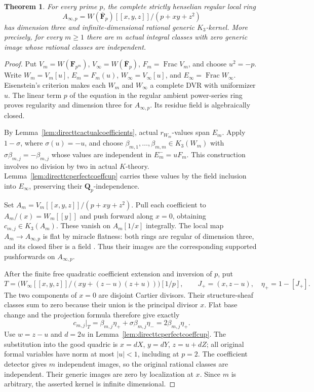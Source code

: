 \documentclass[11pt,a4paper]{article}
\newtheorem{theorem}{Theorem}[section]
\theoremstyle{remark}
\begin{document}
\begin{theorem}\label{thm:directtcstrictinfiniteallp}
For every prime $p$, the complete strictly henselian regular local ring
\[
 A_{\infty,p}=W(\overline{\mathbf F}_p)[[x,y,z]]/(p+xy+z^2)
\]
has dimension three and infinite-dimensional rational generic
$K_3$-kernel. More precisely, for every $m\ge1$ there are $m$ actual
integral classes with zero generic image whose rational classes are
independent.
\end{theorem}
\begin{proof}
Put $V_m=W(\mathbf F_{p^m})$, $V_\infty=W(\overline{\mathbf F}_p)$,
$F_m=\operatorname{Frac}V_m$, and choose $u^2=-p$. Write
$W_m=V_m[u]$, $E_m=F_m(u)$, $W_\infty=V_\infty[u]$, and
$E_\infty=\operatorname{Frac}W_\infty$. Eisenstein's criterion makes
each $W_m$ and $W_\infty$ a complete DVR with uniformizer $u$.
The linear term $p$ of the equation in the regular ambient
power-series ring proves regularity and dimension three for
$A_{\infty,p}$. Its residue field is algebraically closed.

By Lemma~\ref{lem:directtcactualcoefficients}, actual $r_{W_m}$-values
span $E_m$. Apply $1-\sigma$, where $\sigma(u)=-u$, and choose
$\beta_{m,1},\ldots,\beta_{m,m}\in K_3(W_m)$ with
$\sigma\beta_{m,j}=-\beta_{m,j}$ whose values are independent in
$E_m^-=uF_m$. This construction involves no division by two in
actual $K$-theory. Lemma~\ref{lem:directtcperfectcoeffcup} carries
these values by the field inclusion into $E_\infty$, preserving
their $\mathbf Q_p$-independence.

Set $A_m=V_m[[x,y,z]]/(p+xy+z^2)$. Pull each coefficient to
$A_m/(x)=W_m[[y]]$ and push forward along $x=0$, obtaining
$c_{m,j}\in K_3(A_m)$. These vanish on $A_m[1/x]$ integrally.
The local map $A_m\to A_{\infty,p}$ is flat by miracle flatness:
both rings are regular of dimension three, and its closed fiber
is a field \cite[Tag~00R4]{StacksFlatness}. Thus their images
are the corresponding supported pushforwards on $A_{\infty,p}$.

After the finite free quadratic coefficient extension and inversion
of $p$, put
\[
 T=\bigl(W_\infty[[x,y,z]]/(xy+(z-u)(z+u))\bigr)[1/p],
 \qquad J_+=(x,z-u),\quad\eta_+=1-[J_+].
\]
The two components of $x=0$ are disjoint Cartier divisors. Their
structure-sheaf classes sum to zero because their union is the
principal divisor $x$. Flat base change and the projection formula
therefore give exactly
\[
 c_{m,j}|_T=\beta_{m,j}\eta_+
          +\sigma\beta_{m,j}\eta_-
          =2\beta_{m,j}\eta_+.
\]
Use $w=z-u$ and $d=2u$ in
Lemma~\ref{lem:directtcperfectcoeffcup}. The substitution into the
good quadric is
$x=dX$, $y=dY$, $z=u+dZ$; all original formal variables have norm
at most $|u|<1$, including at $p=2$. The coefficient detector gives
$m$ independent images, so the original rational classes are
independent. Their generic images are zero by localization at $x$.
Since $m$ is arbitrary, the asserted kernel is infinite dimensional.
\end{proof}
\end{document}
